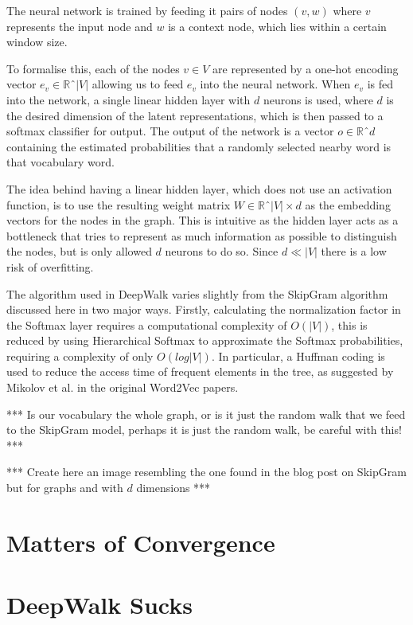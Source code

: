 \documentclass[a4paper]{article}
\begin{document}
The neural network is trained by feeding it pairs of nodes $(v, w)$ where $v$
represents the input node and $w$ is a context node, which lies within a certain
window size.

To formalise this, each of the nodes $v \in V$ are represented by a one-hot
encoding vector $e_v \in \mathbb{R}ˆ|V|$ allowing us to feed $e_v$ into the
neural network. When $e_v$ is fed into the network, a single linear hidden layer with
$d$ neurons is used, where $d$ is the desired dimension of the latent
representations, which is then passed to a softmax classifier for output. The
output of the network is a vector $o \in \mathbb{R}ˆd$ containing the estimated
probabilities that a randomly selected nearby word is that vocabulary word.

The idea behind having a linear hidden layer, which does not use an activation
function, is to use the resulting weight matrix $W \in \mathbb{R}ˆ{|V| \times
  d}$ as the embedding vectors for the nodes in the graph. This is intuitive as
the hidden layer acts as a bottleneck that tries to represent as much
information as possible to distinguish the nodes, but is only allowed $d$
neurons to do so. Since $d \ll |V|$ there is a low risk of overfitting.

The algorithm used in DeepWalk varies slightly from the SkipGram algorithm
discussed here in two major ways. Firstly, calculating the normalization factor
in the Softmax layer requires a computational complexity of $O(|V|)$, this is
reduced by using Hierarchical Softmax to approximate the Softmax probabilities,
requiring a complexity of only $O(log|V|)$. In particular, a Huffman coding is
used to reduce the access time of frequent elements in the tree, as suggested by
Mikolov et al. in the original Word2Vec papers.\cite{mikolov2013distributed,mikolov2013efficient}

*** Is our vocabulary the whole graph, or is it just the random walk that we
feed to the SkipGram model, perhaps it is just the random walk, be careful with
this! ***

*** Create here an image resembling the one found in the blog post on SkipGram
but for graphs and with $d$ dimensions ***
\section{Matters of Convergence}
\section{DeepWalk Sucks}
\end{document}
